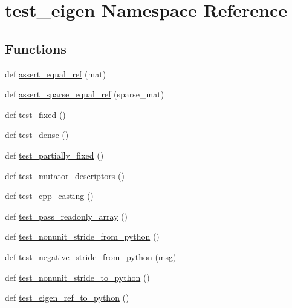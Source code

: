 \hypertarget{namespacetest__eigen}{}\section{test\+\_\+eigen Namespace Reference}
\label{namespacetest__eigen}
\subsection*{Functions}
\begin{DoxyCompactItemize}
\item 
def \mbox{\hyperlink{namespacetest__eigen_a7a3cfeee03efbbfce74f57b2b0674ef5}{assert\+\_\+equal\+\_\+ref}} (mat)
\item 
def \mbox{\hyperlink{namespacetest__eigen_a1335cc38a01e48410a2e8350975aa00f}{assert\+\_\+sparse\+\_\+equal\+\_\+ref}} (sparse\+\_\+mat)
\item 
def \mbox{\hyperlink{namespacetest__eigen_a103972bbd9a4dec9272278be8636d107}{test\+\_\+fixed}} ()
\item 
def \mbox{\hyperlink{namespacetest__eigen_ad89789fe1b480e2e726dfb9d2d2fe33d}{test\+\_\+dense}} ()
\item 
def \mbox{\hyperlink{namespacetest__eigen_a8bc609a976ae2649209d2710bdbbe9bd}{test\+\_\+partially\+\_\+fixed}} ()
\item 
def \mbox{\hyperlink{namespacetest__eigen_a8658a543f18242bc0143a45a161f3b81}{test\+\_\+mutator\+\_\+descriptors}} ()
\item 
def \mbox{\hyperlink{namespacetest__eigen_a89bd422ef1dd99a7c6efffff71225ff7}{test\+\_\+cpp\+\_\+casting}} ()
\item 
def \mbox{\hyperlink{namespacetest__eigen_a2364559bd0dd48718276a25bb003cc6b}{test\+\_\+pass\+\_\+readonly\+\_\+array}} ()
\item 
def \mbox{\hyperlink{namespacetest__eigen_a33842f58fed173a573870d4759aaa85a}{test\+\_\+nonunit\+\_\+stride\+\_\+from\+\_\+python}} ()
\item 
def \mbox{\hyperlink{namespacetest__eigen_a0e35d7be937ef9bac86e71b860295f98}{test\+\_\+negative\+\_\+stride\+\_\+from\+\_\+python}} (msg)
\item 
def \mbox{\hyperlink{namespacetest__eigen_a0ad2263986fc60b25ac4f026ebe7f15b}{test\+\_\+nonunit\+\_\+stride\+\_\+to\+\_\+python}} ()
\item 
def \mbox{\hyperlink{namespacetest__eigen_aa3f3ef0aaadc344c5582c45e225b33b1}{test\+\_\+eigen\+\_\+ref\+\_\+to\+\_\+python}} ()
\item 

\end{DoxyCompactItemize}
